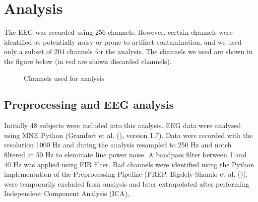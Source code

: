 \documentclass[
  letterpaper,
  DIV=11,
  numbers=noendperiod]{scrartcl}
\author{}
\date{}
\begin{document}
\section{Analysis}\label{analysis}

The EEG was recorded using 256 channels. However, certain channels were
identified as potentially noisy or prone to artifact contamination, and
we used only a subset of 204 channels for the analysis. The channels we
used are shown in the figure below (in red are shown discarded
channels).

\begin{figure}


\caption{\label{fig-channels}Channels used for analysis}

\end{figure}%

\subsection{Preprocessing and EEG
analysis}\label{preprocessing-and-eeg-analysis}

Initially 48 subjects were included into this analysis. EEG data were
analysed using MNE Python (Gramfort et al.
(), version 1.7). Data were
recorded with the resolution 1000 Hz and during the analysis resampled
to 250 Hz and notch filtered at 50 Hz to eleminate line power noise. A
bandpass filter between 1 and 40 Hz was applied using FIR filter. Bad
channels were identified using the Python implementation of the
Preprocessing Pipeline (PREP, Bigdely-Shamlo et al.
()), were
temporarily excluded from analysis and later extrapolated after
performing Independent Component Analysis (ICA).
\end{document}
